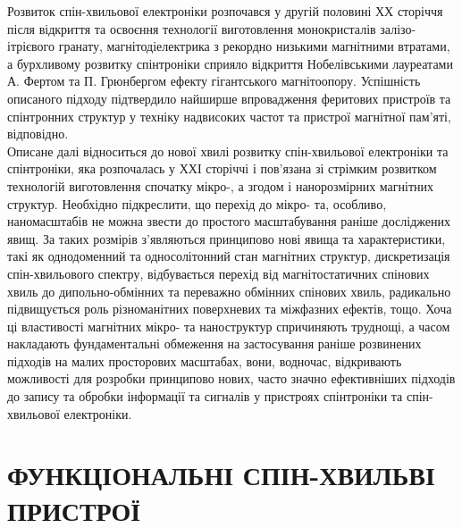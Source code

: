 \documentclass[a4paper,14pt]{extreport}
\begin{document}
Розвиток спін-хвильової електроніки розпочався у другій половині ХХ сторіччя після
відкриття та освоєння технології виготовлення монокристалів залізо-ітрієвого гранату,
магнітодіелектрика з рекордно низькими магнітними втратами, а бурхливому розвитку
спінтроніки сприяло відкриття Нобелівськими лауреатами А. Фертом та П. Грюнбергом\cite{lit1} ефекту
гігантського магнітоопору. Успішність описаного підходу підтвердило найширше
впровадження феритових пристроїв та спінтронних структур у техніку надвисоких частот та
пристрої магнітної пам’яті, відповідно.\\
 
Описане далі відноситься до нової хвилі розвитку спін-хвильової електроніки та
спінтроніки, яка розпочалась у ХХІ сторіччі і пов’язана зі стрімким розвитком технологій
виготовлення спочатку мікро-, а згодом і нанорозмірних магнітних структур. Необхідно
підкреслити, що перехід до мікро- та, особливо, наномасштабів не можна звести до простого
масштабування раніше досліджених явищ. За таких розмірів з’являються принципово нові
явища та характеристики, такі як однодоменний та односолітонний стан магнітних структур,
дискретизація спін-хвильового спектру, відбувається перехід від магнітостатичних спінових
хвиль до дипольно-обмінних та переважно обмінних спінових хвиль, радикально
підвищується роль різноманітних поверхневих та міжфазних ефектів, тощо. Хоча ці
властивості магнітних мікро- та наноструктур спричиняють труднощі, а часом накладають фундаментальні обмеження на застосування раніше розвинених підходів на малих
просторових масштабах, вони, водночас, відкривають можливості для розробки принципово
нових, часто значно ефективніших підходів до запису та обробки інформації та сигналів у
пристроях спінтроніки та спін-хвильової електроніки.\\ 




\chapter{ФУНКЦІОНАЛЬНІ СПІН-ХВИЛЬВІ ПРИСТРОЇ}\par
\end{document}

